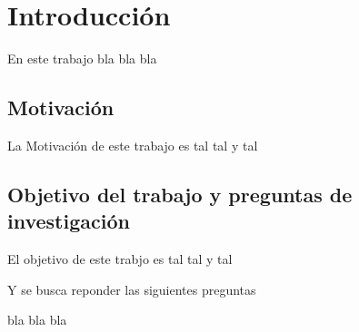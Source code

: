 \chapter{Introducción}\label{chap:intro}
En este trabajo bla bla bla

\section{Motivación}\label{chap:motivacion}
La Motivación de este trabajo es tal tal y tal

\section{Objetivo del trabajo y preguntas de investigación}
El objetivo de este trabjo es tal tal y tal

Y se busca reponder las siguientes preguntas

bla bla bla
